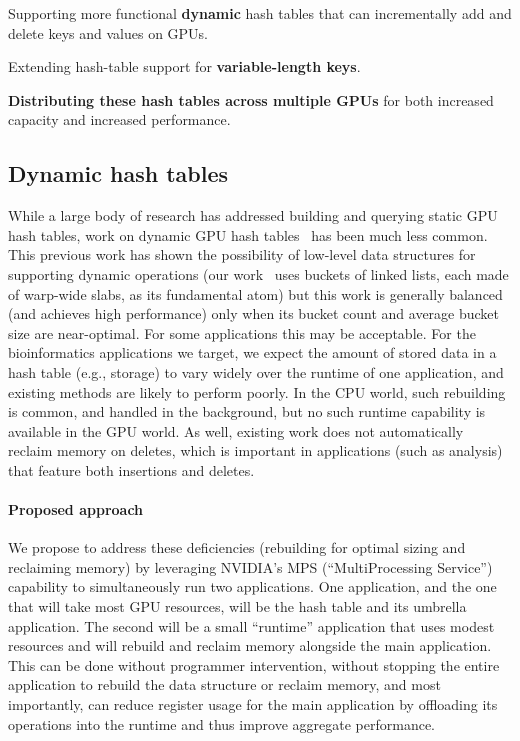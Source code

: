 \begin{rproblem}
  Supporting more functional \textbf{dynamic} hash tables that can incrementally add and delete keys and values on GPUs.
  \label{rprob:dynamic-gpu-hashtable}
\end{rproblem}

\begin{rproblem}
  Extending hash-table support for \textbf{variable-length keys}.
  \label{rprob:variable-hashtable}
\end{rproblem}

\begin{rproblem}
  \textbf{Distributing these hash tables across multiple GPUs} for both increased capacity and increased performance.
  \label{rprob:dist-hashtable}
\end{rproblem}

\subsection{Dynamic hash tables}

While a large body of research has addressed building and querying static GPU hash tables, work on dynamic GPU hash tables~\cite{Ashkiani:2018:ADH,Junger:2020:WAL,Li:2021:DDH,Zhou:2021:DAD} has been much less common. This previous work has shown the possibility of low-level data structures for supporting dynamic operations (our work~\cite{Ashkiani:2018:ADH} uses buckets of linked lists, each made of warp-wide slabs, as its fundamental atom) but this work is generally balanced (and achieves high performance) only when its bucket count and average bucket size are near-optimal. For some applications this may be acceptable. For the bioinformatics applications we target, we expect the amount of stored data in a hash table (e.g., \kmer storage) to vary widely over the runtime of one application, and existing methods are likely to perform poorly. In the CPU world, such rebuilding is common, and handled in the background, but no such runtime capability is available in the GPU world. As well, existing work does not automatically reclaim memory on deletes, which is important in applications (such as \kmer analysis) that feature both insertions and deletes.

\paragraph{Proposed approach}

We propose to address these deficiencies (rebuilding for optimal sizing and reclaiming memory) by leveraging NVIDIA's MPS (``MultiProcessing Service'') capability to simultaneously run two applications. One application, and the one that will take most GPU resources, will be the hash table and its umbrella application. The second will be a small ``runtime'' application that uses modest resources and will rebuild and reclaim memory alongside the main application. This can be done without programmer intervention, without stopping the entire application to rebuild the data structure or reclaim memory, and most importantly, can reduce register usage for the main application by offloading its operations into the runtime and thus improve aggregate performance.

